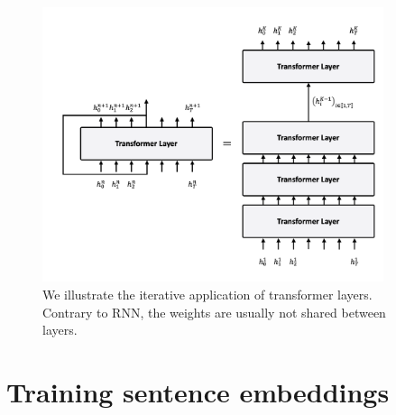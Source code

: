 
\begin{figure}[!ht]
	\includegraphics[width=10cm]{images/transformer_layer_unfold.png}
	\caption[RNN cell unfold]{We illustrate the iterative application of transformer layers. Contrary to RNN, the weights are usually not shared between layers.}
\end{figure}

\section{Training sentence embeddings}


